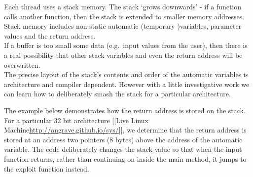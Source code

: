 Each thread uses a stack memory. The stack `grows downwards' - if a
function calls another function, then the stack is extended to smaller
memory addresses.\\Stack memory includes non-static automatic (temporary
)variables, parameter values and the return address.\\If a buffer is too
small some data (e.g.~input values from the user), then there is a real
possibility that other stack variables and even the return address will
be overwritten.\\The precise layout of the stack's contents and order of
the automatic variables is architecture and compiler dependent. However
with a little investigative work we can learn how to deliberately smash
the stack for a particular architecture.

The example below demonstrates how the return address is stored on the
stack. For a particular 32 bit architecture {[}{[}Live Linux
Machine\textbar{}\url{http://angrave.github.io/sys/}{]}{]}, we determine
that the return address is stored at an address two pointers (8 bytes)
above the address of the automatic variable. The code deliberately
changes the stack value so that when the input function returns, rather
than continuing on inside the main method, it jumps to the exploit
function instead.

\begin{Shaded}
\end{Shaded}

